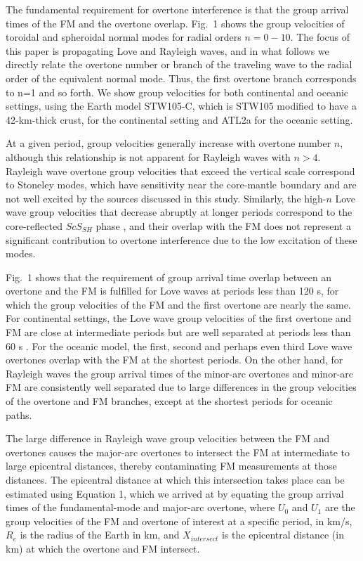 \documentclass[extra,mreferee]{gji}
\begin{document}
 The fundamental requirement for overtone interference is that the group arrival times of the FM and the overtone overlap. Fig.\ 1 shows the group velocities of toroidal and spheroidal normal modes for radial orders $n=0-10$. The focus of this paper is propagating Love and Rayleigh waves, and in what follows we directly relate the overtone number or branch of the traveling wave to the radial order of the equivalent normal mode. Thus, the first overtone branch corresponds to n=1 and so forth. We show group velocities for both continental and oceanic settings, using the Earth model STW105-C, which is STW105 \citep{kustowski2008anisotropic} modified to have a 42-km-thick crust, for the continental setting and ATL2a \citep{james2014rayleigh} for the oceanic setting. 

At a given period, group velocities generally increase with  overtone number $n$, although this relationship is not apparent for Rayleigh waves with $n > 4$.  Rayleigh wave overtone group velocities that exceed the vertical scale correspond to Stoneley modes, which have sensitivity near the core-mantle boundary and are not well excited by the sources discussed in this study. Similarly, the high-$n$ Love wave group velocities that decrease abruptly at longer periods correspond to the core-reflected $ScS_{SH}$ phase \citep{dahlen1998theoretical}, and their overlap with the FM does not represent a significant contribution to overtone interference due to the low excitation of these modes.

Fig.\ 1 shows that the requirement of group arrival time overlap between an overtone and the FM is fulfilled for Love waves at periods less than 120 s, for which the group velocities of the FM and the first overtone are nearly the same. For continental settings, the Love wave group velocities of the first overtone and FM are close at intermediate periods but are well separated at periods less than 60 s \citep{nettles2011effect}. For the oceanic model, the first, second and perhaps even third Love wave overtones overlap with the FM at the shortest periods. On the other hand, for Rayleigh waves the group arrival times of the minor-arc overtones and minor-arc FM are consistently well separated due to large differences in the group velocities of the overtone and FM branches, except at the shortest periods for oceanic paths.

The large difference in Rayleigh wave group velocities between the FM and overtones causes the major-arc overtones to intersect the FM at intermediate to large epicentral distances, thereby contaminating FM measurements at those distances. The epicentral distance at which this intersection takes place can be estimated using Equation 1,  which we arrived at by equating the group arrival times of the fundamental-mode and major-arc overtone, where $U_{0}$ and $U_{1}$ are the group velocities of the FM and overtone of interest at a specific period, in km/s, $R_e$ is the radius of the Earth in km, and $X_{intersect}$ is the epicentral distance (in km) at which the overtone and FM intersect.
\end{document}
